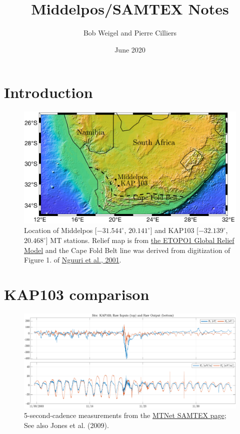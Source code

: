 \documentclass{article}
\title{Middelpos/SAMTEX Notes}
\author{Bob Weigel and Pierre Cilliers}
\date{June 2020}
\begin{document}

\section{Introduction}


\begin{figure}[h!]
\centering
\includegraphics[width=\textwidth]{figures/map.pdf}
\caption{Location of Middelpos [$-31.544^\circ$, $20.141^\circ$] and KAP103 [$-32.139^\circ$, $20.468^\circ$] MT stations. Relief map is from \href{ngdc.noaa.gov/mgg/global/global.html}{the ETOPO1 Global Relief Model} and the Cape Fold Belt line was derived from digitization of Figure 1. of \href{https://agupubs.onlinelibrary.wiley.com/doi/pdf/10.1029/2000GL012587}{Nguuri et al., 2001}.}
\label{fig:map}
\end{figure}

\clearpage

\section{KAP103 comparison}

\begin{figure}[h!]
\centering
\includegraphics[width=\textwidth]{figures/KAP103/timeseries.pdf}
\caption{5-second-cadence measurements from the \href{https://www.mtnet.info/data/samtex/samtex.html}{MTNet SAMTEX page}; See also Jones et al. (2009).}
\label{fig:KAP103_timeseries}
\end{figure}
\end{document}
